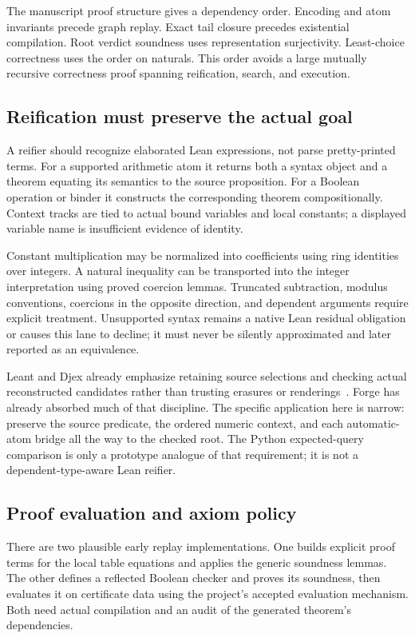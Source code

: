 The manuscript proof structure gives a dependency order. Encoding and atom invariants precede graph replay. Exact tail closure precedes existential compilation. Root verdict soundness uses representation surjectivity. Least-choice correctness uses the order on naturals. This order avoids a large mutually recursive correctness proof spanning reification, search, and execution.

\subsection{Reification must preserve the actual goal}
A reifier should recognize elaborated Lean expressions, not parse pretty-printed terms. For a supported arithmetic atom it returns both a syntax object and a theorem equating its semantics to the source proposition. For a Boolean operation or binder it constructs the corresponding theorem compositionally. Context tracks are tied to actual bound variables and local constants; a displayed variable name is insufficient evidence of identity.

Constant multiplication may be normalized into coefficients using ring identities over integers. A natural inequality can be transported into the integer interpretation using proved coercion lemmas. Truncated subtraction, modulus conventions, coercions in the opposite direction, and dependent arguments require explicit treatment. Unsupported syntax remains a native Lean residual obligation or causes this lane to decline; it must never be silently approximated and later reported as an equivalence.

Leant and Djex already emphasize retaining source selections and checking actual reconstructed candidates rather than trusting erasures or renderings~\cite{leant,djex}. Forge has already absorbed much of that discipline. The specific application here is narrow: preserve the source predicate, the ordered numeric context, and each automatic-atom bridge all the way to the checked root. The Python expected-query comparison is only a prototype analogue of that requirement; it is not a dependent-type-aware Lean reifier.

\subsection{Proof evaluation and axiom policy}
There are two plausible early replay implementations. One builds explicit proof terms for the local table equations and applies the generic soundness lemmas. The other defines a reflected Boolean checker and proves its soundness, then evaluates it on certificate data using the project's accepted evaluation mechanism. Both need actual compilation and an audit of the generated theorem's dependencies.

